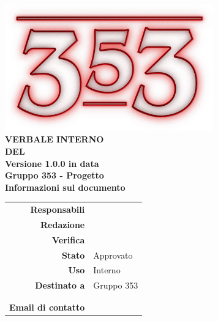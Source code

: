 \documentclass[openany, a4paper, 12pt]{report}
\begin{document}
\begin{titlepage}
	\centering
	\vfill
	{
		\bfseries
		\vskip2cm
		\includegraphics[width=9cm]{../../common/images/logo.png} \\
		\vfill
		\Huge{VERBALE INTERNO\\DEL {}}\\
		\vfill
		\Large Versione 1.0.0 in data \\
		\large Gruppo 353 - Progetto \progetto \\
		\vfill
		\normalsize Informazioni sul documento\\
		\begin{table}[htbp]
			\centering
			\renewcommand\arraystretch{1.2}
			\begin{tabular}{r|l}
				\hline

				\textbf{Responsabili}	& \Davide \\
				
				\textbf{Redazione} 		&  \Valentina\\
				\textbf{Verifica} 		&  \Riccardo\\	
				
				\textbf{Stato} 			& Approvato\\
				\textbf{Uso}			& Interno\\
				\textbf{Destinato a}   	& Gruppo 353\\
										& \Vardanega\\
										& \Cardin\\
				
				\textbf{Email di contatto}	& \mailgroup
			\end{tabular}
		\end{table}
		\vfill 
	}    
\end{titlepage}


 
\end{document}

